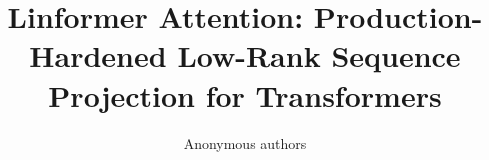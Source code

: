 \title{\textbf{Linformer Attention: Production-Hardened Low-Rank Sequence Projection for Transformers}}

\author{Anonymous authors}
